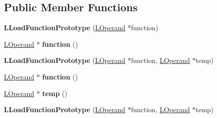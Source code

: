 \subsection*{Public Member Functions}
\begin{DoxyCompactItemize}
\item 
{\bfseries L\+Load\+Function\+Prototype} (\hyperlink{classv8_1_1internal_1_1_l_operand}{L\+Operand} $\ast$function)\hypertarget{classv8_1_1internal_1_1_l_load_function_prototype_a4d1de4aa8b8a3a2efaff628f4d26c8ba}{}\label{classv8_1_1internal_1_1_l_load_function_prototype_a4d1de4aa8b8a3a2efaff628f4d26c8ba}

\item 
\hyperlink{classv8_1_1internal_1_1_l_operand}{L\+Operand} $\ast$ {\bfseries function} ()\hypertarget{classv8_1_1internal_1_1_l_load_function_prototype_a872ed82f1b00acb40e63ac3069064377}{}\label{classv8_1_1internal_1_1_l_load_function_prototype_a872ed82f1b00acb40e63ac3069064377}

\item 
{\bfseries L\+Load\+Function\+Prototype} (\hyperlink{classv8_1_1internal_1_1_l_operand}{L\+Operand} $\ast$function, \hyperlink{classv8_1_1internal_1_1_l_operand}{L\+Operand} $\ast$temp)\hypertarget{classv8_1_1internal_1_1_l_load_function_prototype_ad37966940e05366cdbfdcb5c5c784d67}{}\label{classv8_1_1internal_1_1_l_load_function_prototype_ad37966940e05366cdbfdcb5c5c784d67}

\item 
\hyperlink{classv8_1_1internal_1_1_l_operand}{L\+Operand} $\ast$ {\bfseries function} ()\hypertarget{classv8_1_1internal_1_1_l_load_function_prototype_a872ed82f1b00acb40e63ac3069064377}{}\label{classv8_1_1internal_1_1_l_load_function_prototype_a872ed82f1b00acb40e63ac3069064377}

\item 
\hyperlink{classv8_1_1internal_1_1_l_operand}{L\+Operand} $\ast$ {\bfseries temp} ()\hypertarget{classv8_1_1internal_1_1_l_load_function_prototype_abde24fd14f23dd454ceef1ac7987c796}{}\label{classv8_1_1internal_1_1_l_load_function_prototype_abde24fd14f23dd454ceef1ac7987c796}

\item 
{\bfseries L\+Load\+Function\+Prototype} (\hyperlink{classv8_1_1internal_1_1_l_operand}{L\+Operand} $\ast$function, \hyperlink{classv8_1_1internal_1_1_l_operand}{L\+Operand} $\ast$temp)\hypertarget{classv8_1_1internal_1_1_l_load_function_prototype_ad37966940e05366cdbfdcb5c5c784d67}{}\label{classv8_1_1internal_1_1_l_load_function_prototype_ad37966940e05366cdbfdcb5c5c784d67}


\end{DoxyCompactItemize}

